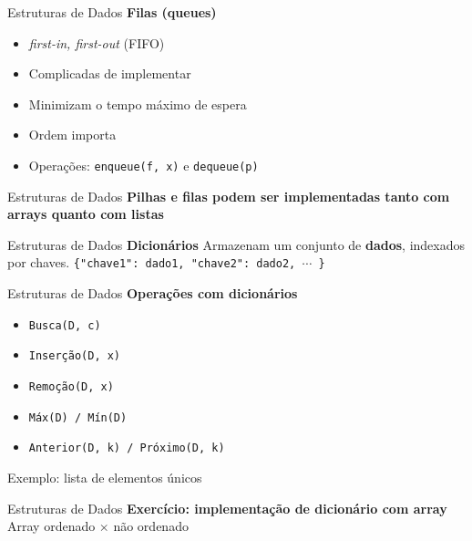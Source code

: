 \documentclass[10pt]{beamer}
\begin{document}
\begin{frame}{Estruturas de Dados}
  \huge
  \textbf{Filas (queues)}
  \vfill
  \Large
  \begin{itemize}
    \item \textit{first-in, first-out} (FIFO)
    \item Complicadas de implementar
    \item Minimizam o tempo máximo de espera
    \item Ordem importa
    \item Operações: \texttt{enqueue(f, x)} e \texttt{dequeue(p)}
  \end{itemize}
\end{frame}

\begin{frame}{Estruturas de Dados}
  \huge
  \textbf{Pilhas e filas podem ser implementadas tanto com arrays quanto com listas}
\end{frame}

\begin{frame}{Estruturas de Dados}
  \huge
  \textbf{Dicionários}
  \vfill
  \Large
  Armazenam um conjunto de \textbf{dados}, indexados por chaves.
  \vfill
  \large
  \texttt{\{"chave1": dado1, "chave2": dado2, $\cdots$ \}}

\end{frame}

\begin{frame}{Estruturas de Dados}
  \huge
  \textbf{Operações com dicionários}
  \vfill
  \Large
  \begin{itemize}
    \item \texttt{Busca(D, c)}
    \item \texttt{Inserção(D, x)}
    \item \texttt{Remoção(D, x)}
    \item \texttt{Máx(D) / Mín(D)}
    \item \texttt{Anterior(D, k) / Próximo(D, k)}
  \end{itemize}
  \vfill
  \large
  Exemplo: lista de elementos únicos
\end{frame}

\begin{frame}{Estruturas de Dados}
  \huge
  \textbf{Exercício: implementação de dicionário com array}
  \vfill
  Array ordenado $\times$ não ordenado
\end{frame}
\end{document}
